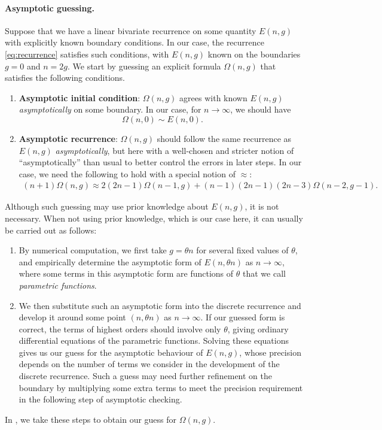 \documentclass[a4paper,12pt]{article}
\theoremstyle{definition}
\newcommand{\E}{E}
\begin{document}
\paragraph{\textbf{Asymptotic guessing.}} Suppose that we have a linear bivariate recurrence on some quantity $E(n, g)$ with explicitly known boundary conditions. In our case, the recurrence \eqref{eq:recurrence} satisfies such conditions, with $E(n, g)$ known on the boundaries $g = 0$ and $n = 2g$. We start by guessing an explicit formula $\Omega(n, g)$ that satisfies the following conditions.
\begin{enumerate}
\item \textbf{Asymptotic initial condition}: $\Omega(n, g)$ agrees with known $E(n, g)$ \emph{asymptotically} on some boundary. In our case, for $n \to \infty$, we should have
  \[     
    \Omega(n,0) \sim \E(n,0).
  \]
\item \textbf{Asymptotic recurrence}: $\Omega(n, g)$ should follow the same recurrence as $E(n, g)$ \emph{asymptotically}, but here with a well-chosen and stricter notion of ``asymptotically'' than usual to better control the errors in later steps. In our case, we need the following to hold with a special notion of $\approx$:
  \begin{align*}
    (n+1) \Omega(n,g) \approx 2 (2n-1) \Omega(n-1, g) + (n-1) (2n-1) (2n-3) \Omega(n-2, g-1).
  \end{align*}
\end{enumerate}
Although such guessing may use prior knowledge about $E(n, g)$, it is not necessary. When not using prior knowledge, which is our case here, it can usually be carried out as follows:
\begin{enumerate}
\item By numerical computation, we first take $g = \theta n$ for several fixed values of $\theta$, and empirically determine the asymptotic form of $E(n, \theta n)$ as $n\to\infty$, where some terms in this asymptotic form are functions of $\theta$ that we call \emph{parametric functions}.
\item We then substitute such an asymptotic form into the discrete recurrence and develop it around some point $(n, \theta n)$ as $n\to\infty$. If our guessed form is correct, the terms of highest orders should involve only $\theta$, giving ordinary differential equations of the parametric functions. Solving these equations gives us our guess for the asymptotic behaviour of $E(n, g)$, whose precision depends on the number of terms we consider in the development of the discrete recurrence. Such a guess may need further refinement on the boundary by multiplying some extra terms to meet the precision requirement in the following step of asymptotic checking.
\end{enumerate}
In , we take these steps to obtain our guess for $\Omega(n, g)$.
\end{document}
